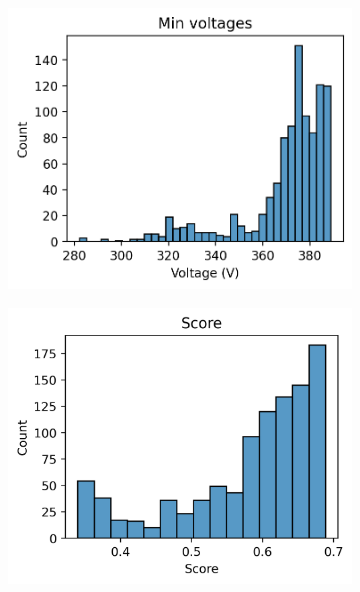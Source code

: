 \begin{figure}[H]
\begin{subfigure}{.33\textwidth}
        \caption{}
        \label{fig:appendix:urban2:histograms:line_loss_rel}
      \end{subfigure}\\
      \begin{subfigure}{.33\textwidth}
        \centering
        \includegraphics[width=\linewidth]{img/switchstate_exploring/urban2/histograms/min_voltage.png}
        \caption{}
        \label{fig:appendix:urban2:histograms:min_voltage}
      \end{subfigure}%
      \begin{subfigure}{.33\textwidth}
        \centering
        \includegraphics[width=\linewidth]{img/switchstate_exploring/urban2/histograms/score.png}
        \caption{}
        \label{fig:appendix:urban2:histograms:score}
      \end{subfigure}
      \caption{}
      \label{fig:appendix:urban2:histograms}
  \end{figure}

